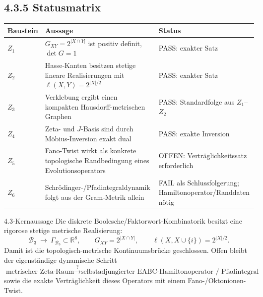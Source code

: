 \documentclass[11pt,a4paper]{article}
\begin{document}
\subsection*{4.3.5 Statusmatrix}
\begin{center}
\small
\begin{tabular}{>{\bfseries}p{} p{} p{}}
\toprule
Baustein & Aussage & Status\\
\midrule
$Z_1$ & $G_{XY}=2^{|X\cap Y|}$ ist positiv definit, $\det G=1$ & PASS: exakter Satz\\[1mm]
$Z_2$ & Hasse-Kanten besitzen stetige lineare Realisierungen mit $\ell(X,Y)=2^{|X|/2}$ & PASS: exakter Satz\\[1mm]
$Z_3$ & Verklebung ergibt einen kompakten Hausdorff-metrischen Graphen & PASS: Standardfolge aus $Z_1$--$Z_2$\\[1mm]
$Z_4$ & Zeta- und $J$-Basis sind durch Möbius-Inversion exakt dual & PASS: exakte Inversion\\[1mm]
$Z_5$ & Fano-Twist wirkt als konkrete topologische Randbedingung eines Evolutionsoperators & OFFEN: Verträglichkeitssatz erforderlich\\[1mm]
$Z_6$ & Schrödinger-/Pfadintegraldynamik folgt aus der Gram-Metrik allein & FAIL als Schlussfolgerung; Hamiltonoperator/Randdaten nötig\\
\bottomrule
\end{tabular}
\normalsize
\end{center}

\begin{statusbox}{4.3-Kernaussage}
Die diskrete Boolesche/Faktorwort-Kombinatorik besitzt eine rigorose stetige metrische Realisierung:
\[
\boxed{
\mathcal B_3\ \longrightarrow\ \Gamma_{\mathcal B_3}\subset\mathbb R^8,
\qquad
G_{XY}=2^{|X\cap Y|},
\qquad
\ell(X,X\cup\{i\})=2^{|X|/2}.}
\]
Damit ist die topologisch-metrische Kontinuumsbrücke geschlossen. Offen bleibt der eigenständige dynamische Schritt
\[
\boxed{
\text{metrischer Zeta-Raum}
\stackrel{?}{\longrightarrow}
\text{selbstadjungierter EABC-Hamiltonoperator / Pfadintegral}
}
\]
sowie die exakte Verträglichkeit dieses Operators mit einem Fano-/Oktonionen-Twist.
\end{statusbox}
\end{document}
